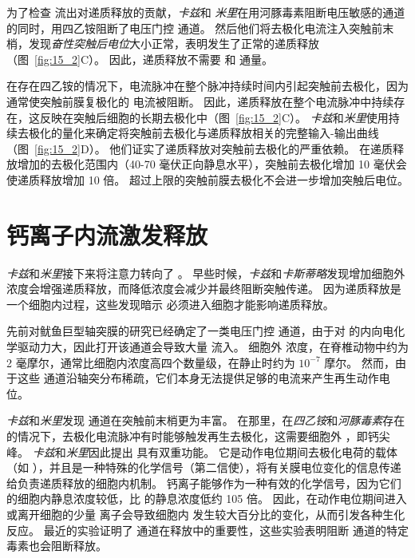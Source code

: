 为了检查  流出对递质释放的贡献，\textit{卡兹}和 \textit{米里}在用河豚毒素阻断电压敏感的通道的同时，用四乙铵阻断了电压门控  通道。
然后他们将去极化电流注入突触前末梢，发现\textit{奋性突触后电位}大小正常，表明发生了正常的递质释放（图~\ref{fig:15_2}C）。
因此，递质释放不需要  和  通量。


在存在四乙铵的情况下，电流脉冲在整个脉冲持续时间内引起突触前去极化，因为通常使突触前膜复极化的  电流被阻断。
因此，递质释放在整个电流脉冲中持续存在，这反映在突触后细胞的长期去极化中（图~\ref{fig:15_2}C）。
\textit{卡兹}和\textit{米里}使用持续去极化的量化来确定将突触前去极化与递质释放相关的完整输入-输出曲线（图~\ref{fig:15_2}D）。
他们证实了递质释放对突触前去极化的严重依赖。
在递质释放增加的去极化范围内（40-70 毫伏正向静息水平），突触前去极化增加 10 毫伏会使递质释放增加 10 倍。
超过上限的突触前膜去极化不会进一步增加突触后电位。



\section{钙离子内流激发释放}

\textit{卡兹}和\textit{米里}接下来将注意力转向了 。
早些时候，\textit{卡兹}和\textit{卡斯蒂略}发现增加细胞外  浓度会增强递质释放，而降低浓度会减少并最终阻断突触传递。
因为递质释放是一个细胞内过程，这些发现暗示  必须进入细胞才能影响递质释放。


先前对鱿鱼巨型轴突膜的研究已经确定了一类电压门控  通道，由于对  的内向电化学驱动力大，因此打开该通道会导致大量  流入。
细胞外  浓度，在脊椎动物中约为 2 毫摩尔，通常比细胞内浓度高四个数量级，在静止时约为 $10^{-7}$ 摩尔。
然而，由于这些  通道沿轴突分布稀疏，它们本身无法提供足够的电流来产生再生动作电位。


\textit{卡兹}和\textit{米里}发现  通道在突触前末梢更为丰富。
在那里，在\textit{四乙铵}和\textit{河豚毒素}存在的情况下，去极化电流脉冲有时能够触发再生去极化，这需要细胞外 ，即钙尖峰。
\textit{卡兹}和\textit{米里}因此提出  具有双重功能。
它是动作电位期间去极化电荷的载体（如 ），并且是一种特殊的化学信号（第二信使），将有关膜电位变化的信息传递给负责递质释放的细胞内机制。
钙离子能够作为一种有效的化学信号，因为它们的细胞内静息浓度较低，比  的静息浓度低约 105 倍。
因此，在动作电位期间进入或离开细胞的少量  离子会导致细胞内  发生较大百分比的变化，从而引发各种生化反应。
最近的实验证明了  通道在释放中的重要性，这些实验表明阻断  通道的特定毒素也会阻断释放。


